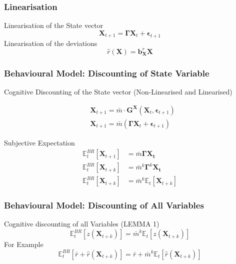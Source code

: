 \documentclass{beamer}
\begin{document}
\subsubsection{Linearisation}
\begin{frame}{\subsecname}

Linearisation of the State vector
\begin{equation}\tag{7}
    \bm{X}_{t+1}=\bm{\Gamma}\bm{X}_{t}+\bm{\epsilon}_{t+1}
\end{equation} 
Linearisation of the deviations
\begin{equation*}
    \hat{r}(\bm{X})= \bm{b}_{\bm{X}}^{r} \bm{X}
\end{equation*}

\end{frame}

\subsubsection{Behavioural Model: Discounting of State Variable}
\begin{frame}{\subsecname}
Cognitive Discounting of the State vector (Non-Linearised and Linearised)


\begin{align}
\tag{8}
&\bm{X}_{t+1}=\bar{m}\cdot\bm{G}^{\bm{X}}(\bm{X}_{t},\bm{\epsilon}_{t+1}) \\
\tag{9}
&\bm{X}_{t+1}=\bar{m}(\bm{\Gamma}\bm{X}_{t}+\bm{\epsilon}_{t+1})
\end{align}

Subjective Expectation
\begin{align*}
\mathbb{E}_{t}^{BR}\left[\bm{X}_{t+1}\right]&= \bar{m}\bm{\Gamma}\bm{X_{t}}\\
\mathbb{E}_{t}^{BR}\left[\bm{X}_{t+k}\right]&=\bar{m}^{k}\bm{\Gamma}^{k}\bm{X_{t}}\\
\tag{10}\mathbb{E}_{t}^{BR}\left[\bm{X}_{t+k}\right]&=\bar{m}^{k}\mathbb{E}_{t}\left[\bm{X}_{t+k}\right]
\end{align*}
\end{frame}
\subsubsection{Behavioural Model: Discounting of All Variables}
\begin{frame}{\subsecname}
Cognitive discounting of all Variables (LEMMA 1)
\begin{equation}\tag{11}
    \mathbb{E}_{t}^{BR}\left[z\left(\bm{X}_{t+k}\right)\right]=\bar{m}^{k}\mathbb{E}_{t}\left[z\left(\bm{X}_{t+k}\right)\right]
\end{equation}
For Example
\begin{equation}\tag{12}
    \mathbb{E}_{t}^{BR}\left[\bar{r}+\hat{r}\left(\bm{X}_{t+k}\right)\right]=\bar{r}+\bar{m}^{k}\mathbb{E}_{t}\left[\hat{r}(\bm{X}_{t+k})\right]
\end{equation}

\end{frame}
\end{document}
